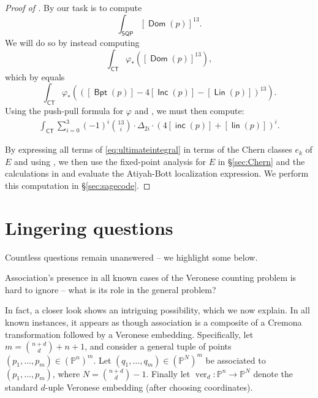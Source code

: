 \documentclass{article}
\renewcommand{\P}{\mathbb{P}}
\DeclareMathOperator{\CT}{\mathsf{CT}}
\DeclareMathOperator{\SQP}{\mathsf{SQP}}
\DeclareMathOperator{\BP}{\mathsf{Bpt}}
\DeclareMathOperator{\Dom}{\mathsf{Dom}}
\DeclareMathOperator{\Lin}{\mathsf{Lin}}
\DeclareMathOperator{\Inc}{\mathsf{Inc}}
\DeclareMathOperator{\lin}{\mathsf{lin}}
\DeclareMathOperator{\inc}{\mathsf{inc}}
\DeclareMathOperator{\ver}{ver}
\begin{document}
\begin{proof}[Proof of ]
    By  our task is to compute \[\int_{\SQP} [\Dom(p)]^{13}.\] We will do so by instead computing \[\int_{\CT}\varphi_{*}\left([\Dom(p)]^{13}\right),\] which by  equals \[\int_{\CT}\varphi_{*}\left(([\BP(p)] - 4[\Inc(p)] - [\Lin(p)])^{13}\right).\]  Using the push-pull formula for $\varphi$ and , we must then compute:  
\begin{align}
\label{eq:ultimateintegral}
\int_{\CT} \sum_{i=0}^{3} (-1)^{i}{13 \choose i} \cdot \Delta_{2i} \cdot \left( 4 [\inc(p)]+[\lin(p)]\right)^{i}.
\end{align}

By expressing all terms of \eqref{eq:ultimateintegral} in terms of the Chern classes $e_{k}$ of $E$ and using , we then use the fixed-point analysis for $E$ in \S \ref{sec:Chern} and the calculations in  and evaluate the Atiyah-Bott localization expression.  We perform this computation in \S \ref{sec:sagecode}.

\end{proof}



\section{Lingering questions}
\label{sec:questions}

Countless questions remain unanswered -- we highlight some below.

\begin{question}
    \label{question:association}
    Association's presence in all known cases of the Veronese counting problem is hard to ignore -- what is its role in the general problem? 
\end{question}  

In fact, a closer look shows an intriguing possibility, which we now explain.  In all known instances, it appears as though association is a composite of a Cremona transformation followed by a Veronese embedding.  Specifically, let $m = {n+d \choose d} + n +1$, and consider a general tuple of points $(p_1, \dots, p_{m}) \in (\P^{n})^{m}$.  Let $(q_1, \dots, q_{m}) \in (\P^{N})^{m}$ be associated to $(p_{1}, \dots, p_{m})$, where $N = {n+d \choose d}-1$. Finally let $\ver_{d} :\P^{n} \to \P^{N}$ denote the standard $d$-uple Veronese embedding (after choosing coordinates).  
\end{document}
